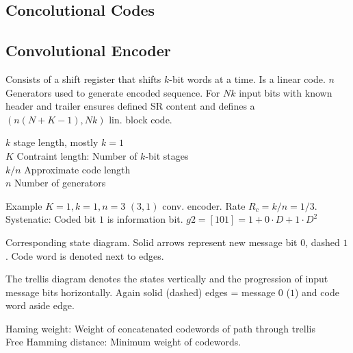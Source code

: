 \documentclass[a4paper, fontsize=8pt, landscape, DIV=1]{scrartcl}
\begin{document}
\begin{multicols*}{4}
  \section{Concolutional Codes}
  \subsection{Convolutional Encoder}
  Consists of a shift register that shifts $k$-bit words at a time. Is a linear
  code. $n$ Generators used to generate encoded sequence. For $Nk$ input bits
  with known header and trailer ensures defined SR content and defines a
  $(n(N+K-1), Nk)$ lin. block code.
  
  $k$ stage length, mostly $k=1$ \\
  $K$ Contraint length: Number of $k$-bit stages \\
  $k/n$ Approximate code length \\
  $n$ Number of generators

  Example $K=1,k=1,n=3$ $(3,1)$ conv. encoder. Rate $R_c=k/n=1/3$. Systenatic: 
  Coded bit $1$ is information bit. $g2=[1 0 1]=1+0\cdot D+1\cdot D^2$

  Corresponding state diagram. Solid arrows represent new message bit $0$, 
  dashed $1$. Code word is denoted next to edges.

  The trellis diagram denotes the states vertically and the progression of
  input message bits horizontally. Again solid (dashed) edges = message $0$ ($1$)
  and code word aside edge.

  Haming weight: Weight of concatenated codewords of path through trellis\\
  Free Hamming distance: Minimum weight of codewords.


\end{multicols*}
\end{document}
